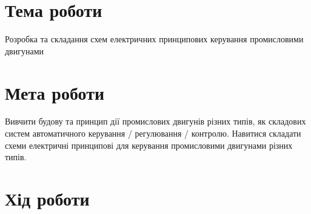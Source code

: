 \documentclass[a4paper]{article}
\begin{document}

    \section*{Тема роботи}
    Розробка та складання схем електричних принципових керування
    промисловими двигунами

    \section*{Мета роботи}
    Вивчити будову та принцип дії промислових двигунів
різних типів, як складових систем автоматичного
керування / регулювання / контролю. Навитися складати схеми електричні
принципові для керування промисловими двигунами різних типів.

    \section*{Хід роботи}
\end{document}

